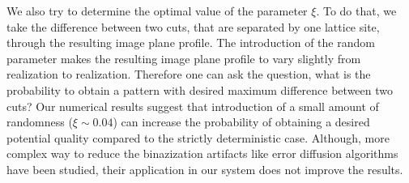 We also try to determine the optimal value of the parameter $\xi$. To do that, we take the difference between two cuts, that are separated by one lattice site, through the resulting image plane profile. The introduction of the random parameter makes the resulting image plane profile to vary slightly from realization to realization. Therefore one can ask the question, what is the probability to obtain a pattern with desired maximum difference between two cuts? Our numerical results suggest that introduction of a small amount of randomness ($\xi \sim 0.04$) can increase the probability of obtaining a desired potential quality compared to the strictly deterministic case. Although, more complex way to reduce the binazization artifacts like error diffusion algorithms \cite{floyd, Hu2018} have been studied, their application in our system does not improve the results. 

